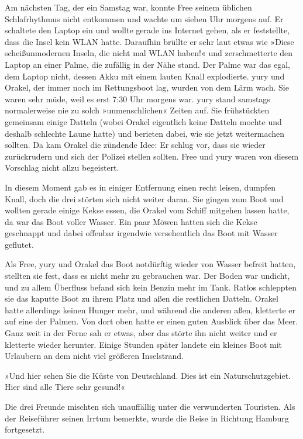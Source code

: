 Am nächsten Tag, der ein Samstag war, konnte Free seinem üblichen Schlafrhythmus nicht entkommen und wachte um sieben Uhr morgens auf. Er schaltete den Laptop ein und wollte gerade ins Internet gehen, als er feststellte, dass die Insel kein WLAN hatte. Daraufhin brüllte er sehr laut etwas wie »Diese scheißunmodernen Inseln, die nicht mal WLAN haben!« und zerschmetterte den Laptop an einer Palme, die zufällig in der Nähe stand. Der Palme war das egal, dem Laptop nicht, dessen Akku mit einem lauten Knall explodierte. yury und Orakel, der immer noch im Rettungsboot lag, wurden von dem Lärm wach. Sie waren sehr müde, weil es erst 7:30 Uhr morgens war. yury stand samstags normalerweise nie zu solch »unmenschlichen« Zeiten auf. Sie frühstückten gemeinsam einige Datteln (wobei Orakel eigentlich keine Datteln mochte und deshalb schlechte Laune hatte) und berieten dabei, wie sie jetzt weitermachen sollten. Da kam Orakel die zündende Idee: Er schlug vor, dass sie wieder zurückrudern und sich der Polizei stellen sollten. Free und yury waren von diesem Vorschlag nicht allzu begeistert.

In diesem Moment gab es in einiger Entfernung einen recht leisen, dumpfen Knall, doch die drei störten sich nicht weiter daran. Sie gingen zum Boot und wollten gerade einige Kekse essen, die Orakel vom Schiff mitgehen lassen hatte, da war das Boot voller Wasser. Ein paar Möwen hatten sich die Kekse geschnappt und dabei offenbar irgendwie versehentlich das Boot mit Wasser geflutet.

Als Free, yury und Orakel das Boot notdürftig wieder von Wasser befreit hatten, stellten sie fest, dass es nicht mehr zu gebrauchen war. Der Boden war undicht, und zu allem Überfluss befand sich kein Benzin mehr im Tank. Ratlos schleppten sie das kaputte Boot zu ihrem Platz und aßen die restlichen Datteln. Orakel hatte allerdings keinen Hunger mehr, und während die anderen aßen, kletterte er auf eine der Palmen. Von dort oben hatte er einen guten Ausblick über das Meer. Ganz weit in der Ferne sah er etwas, aber das störte ihn nicht weiter und er kletterte wieder herunter. Einige Stunden später landete ein kleines Boot mit Urlaubern an dem nicht viel größeren Inselstrand.

»Und hier sehen Sie die Küste von Deutschland. Dies ist ein Naturschutzgebiet. Hier sind alle Tiere sehr gesund!«

Die drei Freunde mischten sich unauffällig unter die verwunderten Touristen. Als der Reiseführer seinen Irrtum bemerkte, wurde die Reise in Richtung Hamburg fortgesetzt.


